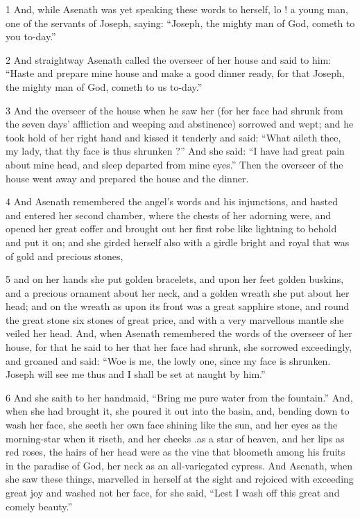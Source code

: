 \par 1 And, while Asenath was yet speaking these words to herself, lo ! a young man, one of the servants of Joseph, saying: “Joseph, the mighty man of God, cometh to you to-day.” 

\par 2 And straightway Asenath called the overseer of her house and said to him: “Haste and prepare mine house and make a good dinner ready, for that Joseph, the mighty man of God, cometh to us to-day.” 

\par 3 And the overseer of the house when he saw her (for her face had shrunk from the seven days' affliction and weeping and abstinence) sorrowed and wept; and he took hold of her right hand and kissed it tenderly and said: “What aileth thee, my lady, that thy face is thus shrunken ?” And she said: “I have had great pain about mine head, and sleep departed from mine eyes.” Then the overseer of the house went away and prepared the house and the dinner. 

\par 4 And Asenath remembered the angel's words and his injunctions, and hasted and entered her second chamber, where the chests of her adorning were, and opened her great coffer and brought out her first robe like lightning to behold and put it on; and she girded herself also with a girdle bright and royal that was of gold and precious stones, 

\par 5 and on her hands she put golden bracelets, and upon her feet golden buskins, and a precious ornament about her neck, and a golden wreath she put about her head; and on the wreath as upon its front was a great sapphire stone, and round the great stone six stones of great price, and with a very marvellous mantle she veiled her head. And, when Asenath remembered the words of the overseer of her house, for that he said to her that her face had shrunk, she sorrowed exceedingly, and groaned and said: “Woe is me, the lowly one, since my face is shrunken. Joseph will see me thus and I shall be set at naught by him.” 

\par 6 And she saith to her handmaid, “Bring me pure water from the fountain.” And, when she had brought it, she poured it out into the basin, and, bending down to wash her face, she seeth her own face shining like the sun, and her eyes as the morning-star when it riseth, and her cheeks .as a star of heaven, and her lips as red roses, the hairs of her head were as the vine that bloometh among his fruits in the paradise of God, her neck as an all-variegated cypress. And Asenath, when she saw these things, marvelled in herself at the sight and rejoiced with exceeding great joy and washed not her face, for she said, “Lest I wash off this great and comely beauty.” 

